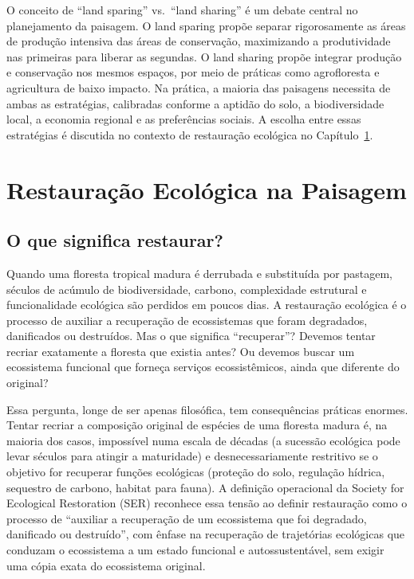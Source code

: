 \documentclass[
  portuguese,
  11pt,
  a4paper,
  open=any]{scrbook}
\begin{document}
\begin{tcolorbox}[enhanced jigsaw, colbacktitle=quarto-callout-tip-color!10!white, coltitle=black, opacityback=0, breakable, left=2mm, colback=white, bottomtitle=1mm, toptitle=1mm, titlerule=0mm, arc=.35mm, opacitybacktitle=0.6, leftrule=.75mm, colframe=quarto-callout-tip-color-frame, title=\textcolor{quarto-callout-tip-color}{\faLightbulb}\hspace{0.5em}{Para aprofundar}, rightrule=.15mm, bottomrule=.15mm, toprule=.15mm]

O conceito de ``land sparing'' vs.~``land sharing'' é um debate central
no planejamento da paisagem. O land sparing propõe separar rigorosamente
as áreas de produção intensiva das áreas de conservação, maximizando a
produtividade nas primeiras para liberar as segundas. O land sharing
propõe integrar produção e conservação nos mesmos espaços, por meio de
práticas como agrofloresta e agricultura de baixo impacto. Na prática, a
maioria das paisagens necessita de ambas as estratégias, calibradas
conforme a aptidão do solo, a biodiversidade local, a economia regional
e as preferências sociais. A escolha entre essas estratégias é discutida
no contexto de restauração ecológica no Capítulo~\ref{sec-restauracao}.

\end{tcolorbox}

\chapter{Restauração Ecológica na Paisagem}\label{sec-restauracao}

\section{O que significa restaurar?}\label{o-que-significa-restaurar}

Quando uma floresta tropical madura é derrubada e substituída por
pastagem, séculos de acúmulo de biodiversidade, carbono, complexidade
estrutural e funcionalidade ecológica são perdidos em poucos dias. A
restauração ecológica é o processo de auxiliar a recuperação de
ecossistemas que foram degradados, danificados ou destruídos. Mas o que
significa ``recuperar''? Devemos tentar recriar exatamente a floresta
que existia antes? Ou devemos buscar um ecossistema funcional que
forneça serviços ecossistêmicos, ainda que diferente do original?

Essa pergunta, longe de ser apenas filosófica, tem consequências
práticas enormes. Tentar recriar a composição original de espécies de
uma floresta madura é, na maioria dos casos, impossível numa escala de
décadas (a sucessão ecológica pode levar séculos para atingir a
maturidade) e desnecessariamente restritivo se o objetivo for recuperar
funções ecológicas (proteção do solo, regulação hídrica, sequestro de
carbono, habitat para fauna). A definição operacional da Society for
Ecological Restoration (SER) reconhece essa tensão ao definir
restauração como o processo de ``auxiliar a recuperação de um
ecossistema que foi degradado, danificado ou destruído'', com ênfase na
recuperação de trajetórias ecológicas que conduzam o ecossistema a um
estado funcional e autossustentável, sem exigir uma cópia exata do
ecossistema original.
\end{document}
